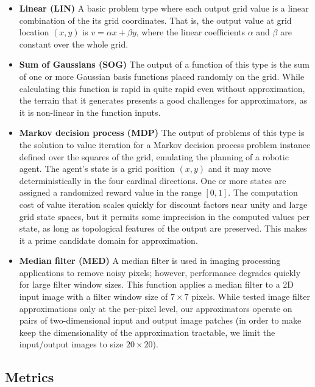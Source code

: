 \documentclass{article}
\begin{document}
\begin{itemize}
\item \textbf{Linear (LIN)} A basic problem type where each output grid value is a linear combination of the its grid coordinates. That is, the output value at grid location $(x, y)$ is $v = \alpha x + \beta y$, where the linear coefficients $\alpha$ and $\beta$ are constant over the whole grid.

\item \textbf{Sum of Gaussians (SOG)} The output of a function of this type is the sum of one or more Gaussian basis functions placed randomly on the grid. While calculating this function is rapid in quite rapid even without approximation, the terrain that it generates presents a good challenges for approximators, as it is non-linear in the function inputs.

\item \textbf{Markov decision process (MDP)} The output of problems of this type is the solution to value iteration for a Markov decision process problem instance defined over the squares of the grid, emulating the planning of a robotic agent. The agent's state is a grid position $(x, y)$ and it may move deterministically in the four cardinal directions. One or more states are assigned a randomized reward value in the range $[0, 1]$. The computation cost of value iteration scales quickly for discount factors near unity and large grid state spaces, but it permits some imprecision in the computed values per state, as long as topological features of the output are preserved. This makes it a prime candidate domain for approximation.

\item \textbf{Median filter (MED)} A median filter is used in imaging processing applications to remove noisy pixels; however, performance degrades quickly for large filter window sizes. This function applies a median filter to a 2D input image with a filter window size of $7 \times 7$ pixels. While \cite{Esmaeilzadeh12} tested image filter approximations only at the per-pixel level, our approximators operate on pairs of two-dimensional input and output image patches (in order to make keep the dimensionality of the approximation tractable, we limit the input/output images to size $20 \times 20$).
\end{itemize}

\subsection{Metrics}
\end{document}
